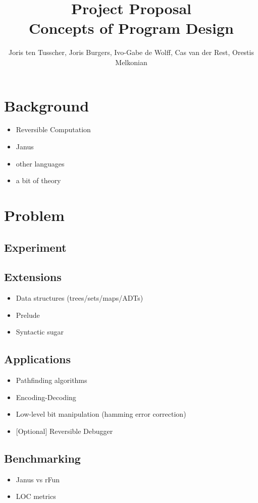 \documentclass[12pt,a4paper]{article}
\title{\textbf{Project Proposal \\ \small{Concepts of Program Design}}}
\author{\small{Joris ten Tusscher, Joris Burgers, Ivo-Gabe de Wolff, Cas van der Rest, Orestis Melkonian}}
\date{}
\begin{document}
\maketitle

\section{Background}
\begin{itemize}
	\item{Reversible Computation}
	\item{Janus}
	\item{other languages}
	\item{a bit of theory}
\end{itemize}

\section{Problem}
	\subsection{Experiment}
	
	\subsection{Extensions}
	\begin{itemize}
		\item{Data structures (trees/sets/maps/ADTs)}
		\item{Prelude}
		\item{Syntactic sugar}
	\end{itemize}
	
	\subsection{Applications}
	\begin{itemize}
		\item{Pathfinding algorithms}
        \item{Encoding-Decoding}
        \item{Low-level bit manipulation (hamming error correction)}
        \item{[Optional] Reversible Debugger}
	\end{itemize}
	
	\subsection{Benchmarking}
	\begin{itemize}
		\item{Janus vs rFun}
		\item{LOC metrics}
	\end{itemize}
	
\end{document}
